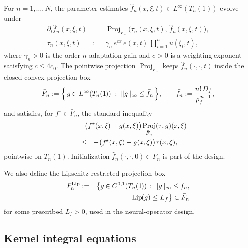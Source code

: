 \documentclass[journal,twoside,web]{ieeecolor}
\DeclareMathOperator{\Proj}{Proj}
\begin{document}
For $n=1,\ldots,N$, the parameter estimates $\hat f_n(x,\xi,t)\in L^\infty(T_n(1))$ evolve under
\begin{eqnarray}
\partial_t\hat f_n(x,\xi,t) &=& \Proj_{\bar F_n}\!\bigl(\tau_n(x,\xi,t),\,\hat f_n(x,\xi,t)\bigr), \label{eq:upd1-N}\\
\tau_n(x,\xi,t) &:=& \gamma_n\,e^{cx}\,e(x,t)\,\prod_{i=1}^n u(\xi_i,t), \label{eq:upd2-N}
\end{eqnarray}
where $\gamma_n>0$ is the order-$n$ adaptation gain and $c>0$ is a weighting exponent satisfying $c\le 4c_0$. The pointwise projection $\Proj_{\bar F_n}$ keeps $\hat f_n(\cdot,\cdot,t)$ inside the closed convex projection box
\begin{equation}\label{eq:box-N}
\bar F_n:=\Bigl\{\,g\in L^\infty(T_n(1))\;:\;\|g\|_\infty\le \bar f_n\,\Bigr\},\qquad \bar f_n:=\frac{n!\,D_f}{\rho_f^{\,n-1}},
\end{equation}
and satisfies, for $f^\star\in\bar F_n$, the standard inequality
\begin{eqnarray}
\lefteqn{-\bigl(f^\star(x,\xi)-g(x,\xi)\bigr)\Proj_{\bar F_n}(\tau,g)(x,\xi)} \nonumber\\
&\le& -\bigl(f^\star(x,\xi)-g(x,\xi)\bigr)\tau(x,\xi), \label{eq:Proj-ineq}
\end{eqnarray}
pointwise on $T_n(1)$. Initialization $\hat f_n(\cdot,\cdot,0)\in \bar F_n$ is part of the design.

We also define the Lipschitz-restricted projection box
\begin{eqnarray}
\bar F_n^{\rm Lip} &:=& \bigl\{g\in C^{0,1}(T_n(1))\,:\,\|g\|_\infty\le \bar f_n, \nonumber\\
&& \mathrm{Lip}(g)\le L_f\bigr\}\subset \bar F_n \label{eq:Bn-Lip}
\end{eqnarray}
for some prescribed $L_f>0$, used in the neural-operator design.

\subsection{Kernel integral equations}\label{sec:kernel-eqs}
\end{document}
